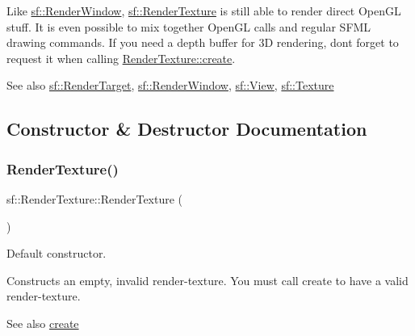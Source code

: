 Like \mbox{\hyperlink{classsf_1_1_render_window}{sf\+::\+Render\+Window}}, \mbox{\hyperlink{classsf_1_1_render_texture}{sf\+::\+Render\+Texture}} is still able to render direct Open\+GL stuff. It is even possible to mix together Open\+GL calls and regular S\+F\+ML drawing commands. If you need a depth buffer for 3D rendering, don\textquotesingle{}t forget to request it when calling \mbox{\hyperlink{classsf_1_1_render_texture_aaec1fb8ee77844da50b0143cb41c8a71}{Render\+Texture\+::create}}.

\begin{DoxySeeAlso}{See also}
\mbox{\hyperlink{classsf_1_1_render_target}{sf\+::\+Render\+Target}}, \mbox{\hyperlink{classsf_1_1_render_window}{sf\+::\+Render\+Window}}, \mbox{\hyperlink{classsf_1_1_view}{sf\+::\+View}}, \mbox{\hyperlink{classsf_1_1_texture}{sf\+::\+Texture}} \begin{DoxyVerb}\end{DoxyVerb}
 
\end{DoxySeeAlso}


\subsection{Constructor \& Destructor Documentation}
\mbox{\label{classsf_1_1_render_texture_a19ee6e5b4c40ad251803389b3953a9c6}} 
\subsubsection{\texorpdfstring{RenderTexture()}{RenderTexture()}}
{\footnotesize\ttfamily sf\+::\+Render\+Texture\+::\+Render\+Texture (\begin{DoxyParamCaption}{ }\end{DoxyParamCaption})}



Default constructor. 

Constructs an empty, invalid render-\/texture. You must call create to have a valid render-\/texture.

\begin{DoxySeeAlso}{See also}
\mbox{\hyperlink{classsf_1_1_render_texture_aaec1fb8ee77844da50b0143cb41c8a71}{create}} \begin{DoxyVerb}\end{DoxyVerb}
 
\end{DoxySeeAlso}
\mbox{\label{classsf_1_1_render_texture_a94b84ab9335be84d2a014c964d973304}} 
